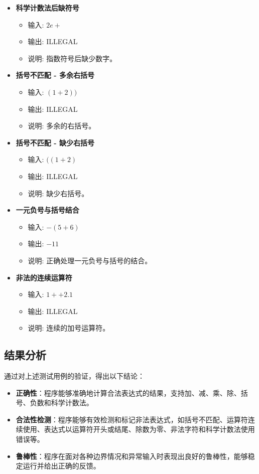 \documentclass{article}
\begin{document}
\begin{itemize}
\begin{itemize}
    \end{itemize}
    \item \textbf{科学计数法后缺符号}
    \begin{itemize}
        \item 输入: \(2e+\)
        \item 输出: ILLEGAL
        \item 说明: 指数符号后缺少数字。
    \end{itemize}
    \item \textbf{括号不匹配 - 多余右括号}
    \begin{itemize}
        \item 输入: \((1 + 2))\)
        \item 输出: ILLEGAL
        \item 说明: 多余的右括号。
    \end{itemize}
    \item \textbf{括号不匹配 - 缺少右括号}
    \begin{itemize}
        \item 输入: \(((1 + 2)\)
        \item 输出: ILLEGAL
        \item 说明: 缺少右括号。
    \end{itemize}
    \item \textbf{一元负号与括号结合}
    \begin{itemize}
        \item 输入: \(-(5+6)\)
        \item 输出: \(-11\)
        \item 说明: 正确处理一元负号与括号的结合。
    \end{itemize}
    \item \textbf{非法的连续运算符}
    \begin{itemize}
        \item 输入: \(1++2.1\)
        \item 输出: ILLEGAL
        \item 说明: 连续的加号运算符。
    \end{itemize}
\end{itemize}

    \subsection{结果分析}
    通过对上述测试用例的验证，得出以下结论：
    \begin{itemize}
        \item \textbf{正确性}：程序能够准确地计算合法表达式的结果，支持加、减、乘、除、括号、负数和科学计数法。
        \item \textbf{合法性检测}：程序能够有效检测和标记非法表达式，如括号不匹配、运算符连续使用、表达式以运算符开头或结尾、除数为零、非法字符和科学计数法使用错误等。
        \item \textbf{鲁棒性}：程序在面对各种边界情况和异常输入时表现出良好的鲁棒性，能够稳定运行并给出正确的反馈。
    \end{itemize}
\end{document}
